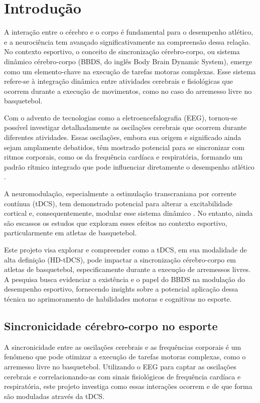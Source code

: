 \chapter{Introdução}
\label{chap:introducao}

A interação entre o cérebro e o corpo é fundamental para o desempenho atlético, e a neurociência tem avançado significativamente na compreensão dessa relação. No contexto esportivo, o conceito de sincronização cérebro-corpo, ou sistema dinâmico cérebro-corpo (BBDS, do inglês Body Brain Dynamic System), emerge como um elemento-chave na execução de tarefas motoras complexas. Esse sistema refere-se à integração dinâmica entre atividades cerebrais e fisiológicas que ocorrem durante a execução de movimentos, como no caso do arremesso livre no basquetebol.

Com o advento de tecnologias como a eletroencefalografia (EEG), tornou-se possível investigar detalhadamente as oscilações cerebrais que ocorrem durante diferentes atividades. Essas oscilações, embora sua origem e significado ainda sejam amplamente debatidos, têm mostrado potencial para se sincronizar com ritmos corporais, como os da frequência cardíaca e respiratória, formando um padrão rítmico integrado que pode influenciar diretamente o desempenho atlético \cite{criscuolo2022cognition, cohen2017where}.

A neuromodulação, especialmente a estimulação transcraniana por corrente contínua (tDCS), tem demonstrado potencial para alterar a excitabilidade cortical e, consequentemente, modular esse sistema dinâmico \cite{nitsche2000excitability, stagg2011physiological}. No entanto, ainda são escassos os estudos que exploram esses efeitos no contexto esportivo, particularmente em atletas de basquetebol.

Este projeto visa explorar e compreender como a tDCS, em sua modalidade de alta definição (HD-tDCS), pode impactar a sincronização cérebro-corpo em atletas de basquetebol, especificamente durante a execução de arremessos livres. A pesquisa busca evidenciar a existência e o papel do BBDS na modulação do desempenho esportivo, fornecendo insights sobre a potencial aplicação dessa técnica no aprimoramento de habilidades motoras e cognitivas no esporte.

\section{Sincronicidade cérebro-corpo no esporte}
A sincronicidade entre as oscilações cerebrais e as frequências corporais é um fenômeno que pode otimizar a execução de tarefas motoras complexas, como o arremesso livre no basquetebol. Utilizando o EEG para captar as oscilações cerebrais e correlacionando-as com sinais fisiológicos de frequência cardíaca e respiratória, este projeto investiga como essas interações ocorrem e de que forma são moduladas através da tDCS.

